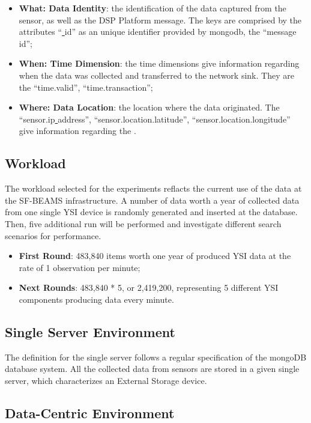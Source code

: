\begin{itemize}
  \item \textbf{What: Data Identity}: the identification of the data captured
  from the sensor, as well as the DSP Platform message. The keys are comprised
  by the attributes ``\underline{ }id'' as an unique identifier provided by
  mongodb, the ``message\underline{ }id'';
  \item \textbf{When: Time Dimension}: the time dimensions give information
  regarding when the data was collected and transferred to the network sink.
  They are the ``time.valid'', ``time.transaction'';
  \item \textbf{Where: Data Location}: the location where 
 the data originated. The ``sensor.ip\underline{ }address'',
 ``sensor.location.latitude'', ``sensor.location.longitude'' give information
 regarding the .
\end{itemize}

\subsection{Workload}
\label{sec:workload}

The workload selected for the experiments reflacts the current use of the data
at the SF-BEAMS infrastructure. A number of data worth a year of collected data
from one single YSI device is randomly generated and inserted at the database.
Then, five additional run will be performed and investigate different search
scenarios for performance.

\begin{itemize}
  \item \textbf{First Round}: 483,840 items worth one year of produced YSI data
  at the rate of 1 observation per minute;
  \item \textbf{Next Rounds}: 483,840 * 5, or 2,419,200, representing 5
  different YSI components producing data every minute.
\end{itemize}

\subsection{Single Server Environment}

The definition for the single server follows a regular specification of the
mongoDB database system. All the collected data from sensors are stored in a
given single server, which characterizes an External Storage device.

\subsection{Data-Centric Environment}

